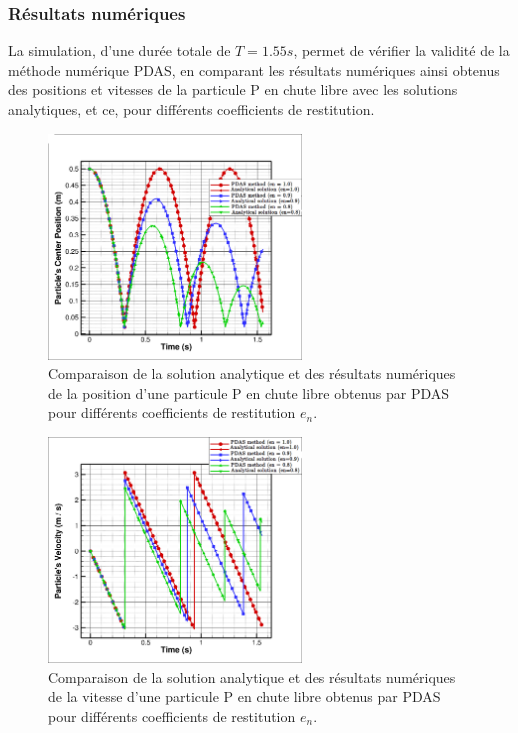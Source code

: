 \subsubsection{Résultats numériques}    

La simulation, d'une durée totale de $T = 1.55 s$, permet de vérifier la validité de la méthode numérique PDAS, en comparant les résultats numériques ainsi obtenus des positions et vitesses de la particule P en chute libre avec les solutions analytiques, et ce, pour différents coefficients de restitution. 
    \begin{figure}[!h]
  \centering
    \includegraphics[width=0.6\textwidth]{chapitres/chapitre_3/figures/x_it_free_falling_particule_en=varied_AS(AM)_vs_anal_sol.png}
    \caption{\centering Comparaison de la solution analytique et des résultats numériques de la position d'une particule P en chute libre obtenus par PDAS pour différents coefficients de restitution $e_n$.}\label{fig36}
\end{figure}
    
    \vspace{1cm}
    
\begin{figure}[!h]
  \centering
    \includegraphics[width=0.6\textwidth]{chapitres/chapitre_3/figures/vel_it_free_falling_particule_en=varied_AS(AM)_vs_anal_sol.png}
    \caption{\centering Comparaison de la solution analytique et des résultats numériques de la vitesse d'une particule P en chute libre obtenus par PDAS pour différents coefficients de restitution $e_n$.}\label{fig37}
\end{figure}
    
